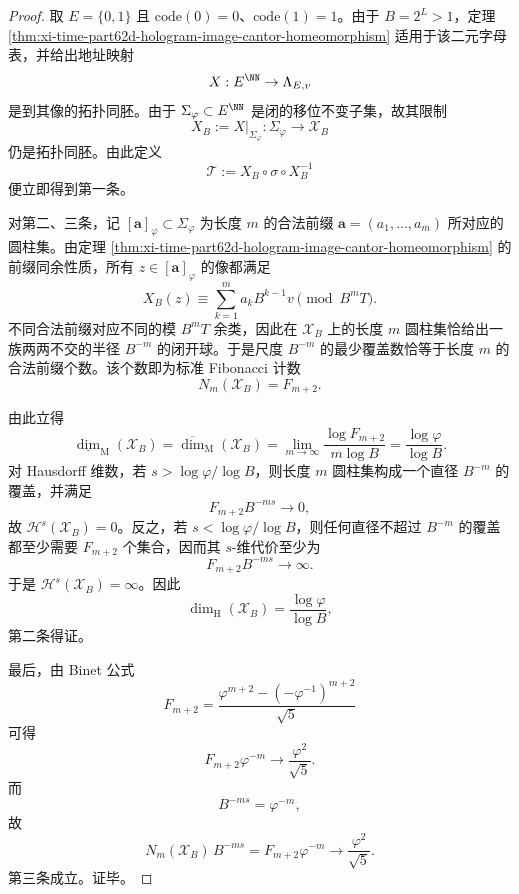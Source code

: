 \begin{proof}
取 \(E=\{0,1\}\) 且 \(\mathrm{code}(0)=0\)、\(\mathrm{code}(1)=1\)。由于 \(B=2^L>1\)，定理
\ref{thm:xi-time-part62d-hologram-image-cantor-homeomorphism}
适用于该二元字母表，并给出地址映射
\[
X:E^{\NN}\to \Lambda_{E,v}
\]
是到其像的拓扑同胚。由于 \(\Sigma_\varphi\subset E^{\NN}\) 是闭的移位不变子集，故其限制
\[
X_B:=X|_{\Sigma_\varphi}
:
\Sigma_\varphi\to \mathcal X_B
\]
仍是拓扑同胚。由此定义
\[
\mathcal T:=X_B\circ \sigma\circ X_B^{-1}
\]
便立即得到第一条。

对第二、三条，记 \([\mathbf a]_\varphi\subset \Sigma_\varphi\) 为长度 \(m\) 的合法前缀 \(\mathbf a=(a_1,\dots,a_m)\) 所对应的圆柱集。由定理
\ref{thm:xi-time-part62d-hologram-image-cantor-homeomorphism}
的前缀同余性质，所有 \(z\in[\mathbf a]_\varphi\) 的像都满足
\[
X_B(z)\equiv \sum_{k=1}^{m}a_kB^{k-1}v\pmod{B^mT}.
\]
不同合法前缀对应不同的模 \(B^mT\) 余类，因此在 \(\mathcal X_B\) 上的长度 \(m\) 圆柱集恰给出一族两两不交的半径 \(B^{-m}\) 的闭开球。于是尺度 \(B^{-m}\) 的最少覆盖数恰等于长度 \(m\) 的合法前缀个数。该个数即为标准 Fibonacci 计数
\[
N_m(\mathcal X_B)=F_{m+2}.
\]

由此立得
\[
\underline{\dim}_{\mathrm M}(\mathcal X_B)
=
\overline{\dim}_{\mathrm M}(\mathcal X_B)
=
\lim_{m\to\infty}\frac{\log F_{m+2}}{m\log B}
=
\frac{\log\varphi}{\log B}.
\]
对 Hausdorff 维数，若 \(s>\log\varphi/\log B\)，则长度 \(m\) 圆柱集构成一个直径 \(B^{-m}\) 的覆盖，并满足
\[
F_{m+2}B^{-ms}\longrightarrow 0,
\]
故 \(\mathcal H^s(\mathcal X_B)=0\)。反之，若 \(s<\log\varphi/\log B\)，则任何直径不超过 \(B^{-m}\) 的覆盖都至少需要 \(F_{m+2}\) 个集合，因而其 \(s\)-维代价至少为
\[
F_{m+2}B^{-ms}\longrightarrow \infty.
\]
于是 \(\mathcal H^s(\mathcal X_B)=\infty\)。因此
\[
\dim_{\mathrm H}(\mathcal X_B)=\frac{\log\varphi}{\log B},
\]
第二条得证。

最后，由 Binet 公式
\[
F_{m+2}=\frac{\varphi^{m+2}-(-\varphi^{-1})^{m+2}}{\sqrt5}
\]
可得
\[
F_{m+2}\varphi^{-m}\longrightarrow \frac{\varphi^2}{\sqrt5}.
\]
而
\[
B^{-ms}=\varphi^{-m},
\]
故
\[
N_m(\mathcal X_B)\,B^{-ms}
=
F_{m+2}\varphi^{-m}
\longrightarrow
\frac{\varphi^2}{\sqrt5}.
\]
第三条成立。证毕。
\end{proof}

